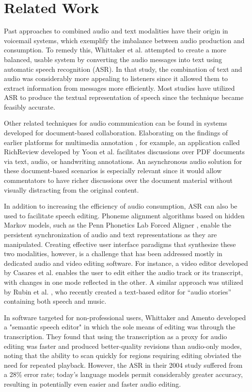 \section{Related Work}
Past approaches to combined audio and text modalities have their origin in voicemail systems, which exemplify the imbalance between audio production and consumption. 
To remedy this, Whittaker et al. \cite{whittaker} attempted to create a more balanced, usable system by converting the audio messages into text using automatic speech recognition (ASR). 
In that study, the combination of text and audio was considerably more appealing to listeners since it allowed them to extract information from messages more efficiently. 
Most studies have utilized ASR to produce the textual representation of speech since the technique became feasibly accurate.

Other related techniques for audio communication can be found in systems developed for document-based collaboration. 
Elaborating on the findings of earlier platforms for multimedia annotation \cite{bargeron}, for example, an application called RichReview developed by Yoon et al. \cite{yoon} facilitates discussions over PDF documents via text, audio, or handwriting annotations. 
An asynchronous audio solution for these document-based scenarios is especially relevant since it would allow commentators to have richer discussions over the document material without visually distracting from the original content. 

In addition to increasing the efficiency of audio consumption, ASR can also be used to facilitate speech editing. 
Phoneme alignment algorithms based on hidden Markov models, such as the Penn Phonetics Lab Forced Aligner \cite{p2fa}, enable the persistent synchronization of audio and text representations as they are manipulated. 
Creating effective user interface paradigms that synthesize these two modalities, however, is a challenge that has been addressed mostly in dedicated audio and video editing software. 
For instance, a video editor developed by Casares et al. \cite{casares} enables the user to edit either the audio track or its transcript, with changes in one mode reflected in the other. 
A similar approach was utilized by Rubin et al. \cite{rubin}, who recently created a text-based editor for ``audio stories'' containing both speech and music.

In software targeted for non-professional users, Whittaker and Amento \cite{whittaker_semantic} developed a "semantic speech editor" in which the sole means of editing was through the transcription. 
They found that using the transcription as a proxy for audio editing was faster and produced better-quality revisions than audio-only modes, noting that the ability to scan quickly for regions requiring editing obviated the need for repeated playback. 
However, the ASR in their 2004 study suffered from a 28\% error rate; today's language models permit considerably greater accuracy, resulting in potentially even easier and faster audio editing.
